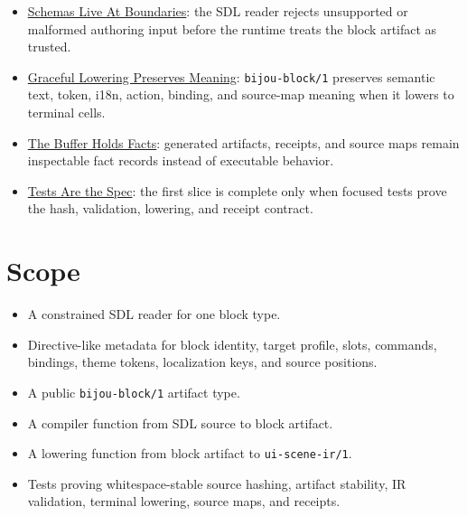 \begin{itemize}
\tightlist
\item
  \href{https://github.com/flyingrobots/bijou/blob/cbd70612140e7a450d764b3c7be1c6af878b99bc/docs/invariants/schemas-live-at-boundaries.md}{Schemas Live At Boundaries}: the SDL reader rejects unsupported or malformed authoring input before the runtime treats the block artifact as trusted.
\item
  \href{https://github.com/flyingrobots/bijou/blob/cbd70612140e7a450d764b3c7be1c6af878b99bc/docs/invariants/graceful-lowering-preserves-meaning.md}{Graceful Lowering Preserves Meaning}: \texttt{b\allowbreak{}i\allowbreak{}j\allowbreak{}o\allowbreak{}u\allowbreak{}-\allowbreak{}b\allowbreak{}l\allowbreak{}o\allowbreak{}c\allowbreak{}k\allowbreak{}/\allowbreak{}1} preserves semantic text, token, i18n, action, binding, and source-map meaning when it lowers to terminal cells.
\item
  \href{https://github.com/flyingrobots/bijou/blob/cbd70612140e7a450d764b3c7be1c6af878b99bc/docs/invariants/buffer-holds-facts.md}{The Buffer Holds Facts}: generated artifacts, receipts, and source maps remain inspectable fact records instead of executable behavior.
\item
  \href{https://github.com/flyingrobots/bijou/blob/cbd70612140e7a450d764b3c7be1c6af878b99bc/docs/invariants/tests-are-the-spec.md}{Tests Are the Spec}: the first slice is complete only when focused tests prove the hash, validation, lowering, and receipt contract.
\end{itemize}

\section{Scope}\label{record-140-scope}

\begin{itemize}
\tightlist
\item
  A constrained SDL reader for one block type.
\item
  Directive-like metadata for block identity, target profile, slots, commands, bindings, theme tokens, localization keys, and source positions.
\item
  A public \texttt{b\allowbreak{}i\allowbreak{}j\allowbreak{}o\allowbreak{}u\allowbreak{}-\allowbreak{}b\allowbreak{}l\allowbreak{}o\allowbreak{}c\allowbreak{}k\allowbreak{}/\allowbreak{}1} artifact type.
\item
  A compiler function from SDL source to block artifact.
\item
  A lowering function from block artifact to \texttt{u\allowbreak{}i\allowbreak{}-\allowbreak{}s\allowbreak{}c\allowbreak{}e\allowbreak{}n\allowbreak{}e\allowbreak{}-\allowbreak{}i\allowbreak{}r\allowbreak{}/\allowbreak{}1}.
\item
  Tests proving whitespace-stable source hashing, artifact stability, IR validation, terminal lowering, source maps, and receipts.
\end{itemize}

